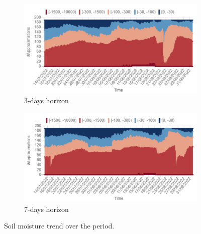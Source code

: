\begin{figure}[t]
    \begin{subfigure}[b]{0.47\textwidth}
        \includegraphics[width=\textwidth]{chapters/physics-aware/orchard/img/3gg_stacked.pdf}
        \caption{3-days horizon}
        \label{orchard-fig:stacked_c}
    \end{subfigure}
    \hfill
    \begin{subfigure}[b]{0.47\textwidth}
        \includegraphics[width=\textwidth]{chapters/physics-aware/orchard/img/7gg_stacked.pdf}
        \caption{7-days horizon}
        \label{orchard-fig:stacked_d}
    \end{subfigure}
    \caption{Soil moisture trend over the period.}
    \label{orchard-fig:stacked}
\end{figure}

